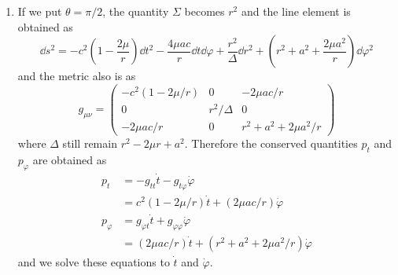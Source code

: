 \documentclass[a4paper,pdftex,10pt]{article}
\begin{document}
\maketitle

\begin{enumerate}
  \item
        If we put $\theta=\pi/2$, the quantity $\Sigma$ becomes $r^2$ and the line element is obtained as
        \begin{equation}
          \dd s^2
          =
          -
          c^2
          \left( 1-\frac{2\mu}{r} \right)\dd t^2
          -
          \frac{4\mu ac}{r}\dd t\dd \varphi
          +
          \frac{r^2}{\Delta}\dd r^2
          +
          \left(
          r^2+a^2+\frac{2\mu a^2}{r}
          \right)
          \dd\varphi^2
        \end{equation}
        and the metric also is as
        \begin{equation}
          g_{\mu\nu}
          =
          \begin{pmatrix}
            -c^2(1-2\mu/r) & 0          & -2\mu ac/r           \\
            0              & r^2/\Delta & 0                    \\
            -2\mu ac/r     & 0          & r^2 + a^2 +2\mu a^2/r
          \end{pmatrix}
        \end{equation}
        where $\Delta$ still remain $r^2-2\mu r+a^2$. Therefore the conserved quantities $p_{t}$ and $p_{\varphi}$ are obtained as 
        \begin{align}
          p_{t}
          &=
          -g_{tt}\dot{t}-g_{t\varphi}\dot{\varphi}
          \nonumber
          \\
          &=
          c^2(1-2\mu/r)\dot{t}
          +
          (2\mu ac/r)\dot{\varphi}
          \\
          p_{\varphi}
          &=
          g_{\varphi t}\dot{t}+g_{\varphi\varphi}\dot{\varphi}
          \nonumber
          \\
          &=
          (2\mu ac/r) \dot{t}
          +
          (r^2 + a^2 +2\mu a^2/r)\dot{\varphi}
        \end{align} 
        and we solve these equations to $\dot{t}$ and $\dot{\varphi}$.












\end{enumerate}
\end{document}
